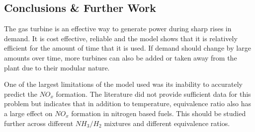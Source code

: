 \subsection{Conclusions \& Further Work}
The gas turbine is an effective way to generate power during sharp rises in demand. It is cost effective, reliable and the model shows that it is relatively efficient for the amount of time that it is used. If demand should change by large amounts over time, more turbines can also be added or taken away from the plant due to their modular nature.

One of the largest limitations of the model used was its inability to accurately predict the $NO_x$ formation. The literature did not provide sufficient data for this problem but indicates that in addition to temperature, equivalence ratio also has a large effect on $NO_x$ formation in nitrogen based fuels. This should be studied further across different $NH_3/H_2$ mixtures and different equivalence ratios.






%